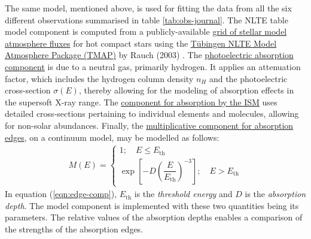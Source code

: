    	The same model, mentioned above, is used for fitting the data from all the six different observations summarised in table \ref{tab:obs-journal}. The NLTE table model component is computed from a publicly-available %
   	\href{http://astro.uni-tuebingen.de/~rauch/TMAF/TMAF.html}{grid of stellar model atmosphere fluxes} for hot compact stars using the \href{http://astro.uni-tuebingen.de/~rauch/TMAP/TMAP.html}{T\"{u}bingen NLTE Model Atmosphere Package (TMAP)} by Rauch (2003) \cite{rauch2003grid}. The %
   	\href{https://heasarc.gsfc.nasa.gov/xanadu/xspec/manual/XSmodelPhabs.html}{photoelectric absorption component} is due to a neutral gas, primarily hydrogen. It applies an attenuation factor, which includes the hydrogen column density $n_H$ and the photoelectric cross-section $\sigma(E)$, thereby allowing for the modeling of absorption effects in the supersoft X-ray range. The %
   	\href{https://heasarc.gsfc.nasa.gov/xanadu/xspec/manual/node255.html}{component for absorption by the ISM} uses detailed cross-sections pertaining to individual elements and molecules, allowing for non-solar abundances. Finally, the %
   	\href{https://heasarc.gsfc.nasa.gov/xanadu/xspec/manual/node247.html}{multiplicative component for absorption edges}, on a continuum model, may be modelled as follows:
    \begin{align}
    	M(E)=\begin{cases}
    		{1;\quad E\leqslant E_\text{th}} \\
    		{\exp{\left[ -D\left(\dfrac{E}{E_\text{th}}\right)^{-3} \right]};\quad E> E_\text{th}}
    	\end{cases} \label{eqn:edge-comp}
    \end{align}
    In equation (\ref{eqn:edge-comp}), $E_\text{th}$ is the \textit{threshold energy} and $D$ is the \textit{absorption depth}. The model component is implemented with these two quantities being its parameters. The relative values of the absorption depths enables a comparison of the strengths of the absorption edges.
    
